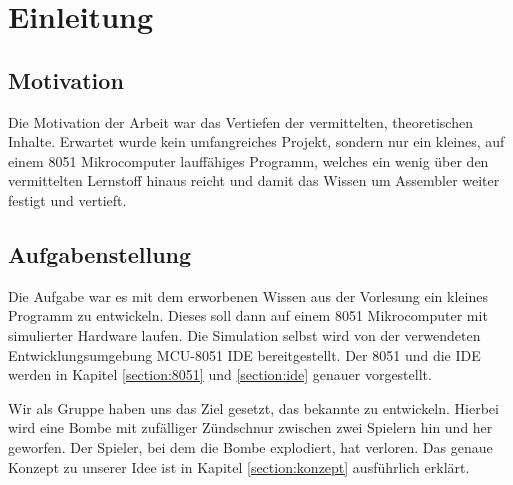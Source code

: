 \chapter{Einleitung}

\section{Motivation}

Die Motivation der Arbeit war das Vertiefen der vermittelten, theoretischen Inhalte. Erwartet wurde kein umfangreiches Projekt, sondern nur ein kleines, auf einem 8051 Mikrocomputer lauffähiges Programm, welches ein wenig über den vermittelten Lernstoff hinaus reicht und damit das Wissen um Assembler weiter festigt und vertieft.

\section{Aufgabenstellung}

Die Aufgabe war es mit dem erworbenen Wissen aus der Vorlesung  ein kleines Programm zu entwickeln. Dieses soll dann auf einem 8051 Mikrocomputer mit simulierter Hardware laufen. Die Simulation selbst wird von der verwendeten Entwicklungsumgebung MCU-8051 IDE bereitgestellt. Der 8051 und die IDE werden in Kapitel \ref{section:8051} und \ref{section:ide} genauer vorgestellt.

Wir als Gruppe haben uns das Ziel gesetzt, das bekannte  zu entwickeln. Hierbei wird eine Bombe mit zufälliger Zündschnur zwischen zwei Spielern hin und her geworfen. Der Spieler, bei dem die Bombe explodiert, hat verloren. Das genaue Konzept zu unserer Idee ist in Kapitel \ref{section:konzept} ausführlich erklärt.